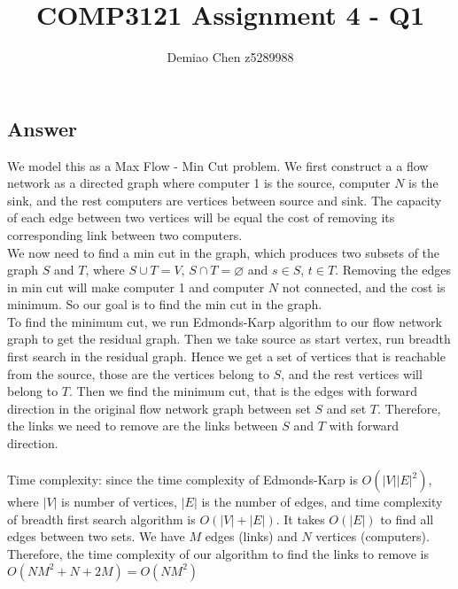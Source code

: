 \documentclass[12pt]{article}
\title{COMP3121 Assignment 4 - Q1}
\author{Demiao Chen z5289988}
\begin{document}
\maketitle
{}

\subsection*{Answer}
We model this as a Max Flow - Min Cut problem. We first construct a 
a ﬂow network as a directed graph where computer 1 is the source,
computer $N$ is the sink, and the rest computers
are vertices between source and sink. The capacity of each edge between
two vertices will be equal the cost of removing its corresponding link
between two computers.\\
We now need to find a min cut in the graph, which produces two subsets 
of the graph $S$ and $T$, where $S \cup  T = V$, $S \cap T = \varnothing$ and
$s \in S$, $t \in T$. Removing the edges in min cut will make computer 1
and computer $N$ not connected, and the cost is minimum. So our goal 
is to find the min cut in the graph.\\
To find the minimum cut, we run Edmonds-Karp algorithm to our
flow network graph to get the residual graph. Then we take 
source as start vertex, run breadth first search in the residual graph.
Hence we get a set of vertices that is reachable from the source,
those are the vertices belong to $S$, and the rest vertices will belong 
to $T$. Then we find the minimum cut, that is the edges 
with forward direction in the original flow network graph
between set $S$ and set $T$. Therefore, the links 
we need to remove are the links between $S$ and $T$ with forward direction.\\\\
Time complexity: since the time complexity of Edmonds-Karp is $O(|V||E|^2)$, where $|V|$
is number of vertices, $|E|$ is the number of edges, and time complexity of breadth
first search algorithm is $O(|V|+|E|)$. It takes $O(|E|)$ 
to find all edges between two sets. We have
$M$ edges (links) and $N$ vertices (computers).
Therefore, the time complexity of our algorithm to find the links to remove is $O(NM^2 + N + 2M) = O(NM^2)$
\end{document}
